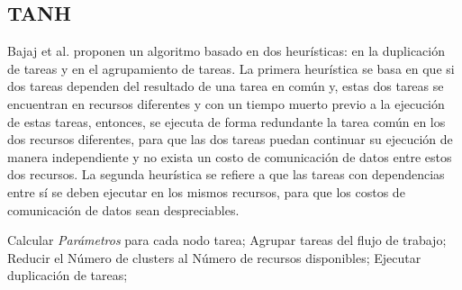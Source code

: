 \subsection{TANH}
\label{alg:tanh}
Bajaj et al. \cite{bajaj2004improving} proponen un algoritmo basado en dos heurísticas: en la duplicación de tareas y en el agrupamiento de tareas. La primera heurística se basa en que si dos tareas dependen del resultado de una tarea en común y, estas dos tareas se encuentran en recursos diferentes y con un tiempo muerto previo a la ejecución de estas tareas, entonces, se ejecuta de forma redundante la tarea común en los dos recursos diferentes, para que las dos tareas puedan continuar su ejecución de manera independiente y no exista un costo de comunicación de datos entre estos dos recursos. La segunda heurística se refiere a que las tareas con dependencias entre sí se deben ejecutar en los mismos recursos, para que los costos de comunicación de datos sean despreciables.
\\
\begin{algorithmic}[1]
\State Calcular \emph{Parámetros} para cada nodo tarea;
\State Agrupar tareas del flujo de trabajo;
	\State Reducir el Número de clusters al Número de recursos disponibles;
\Else
	\State Ejecutar duplicación de tareas;
\EndIf
\end{algorithmic}



